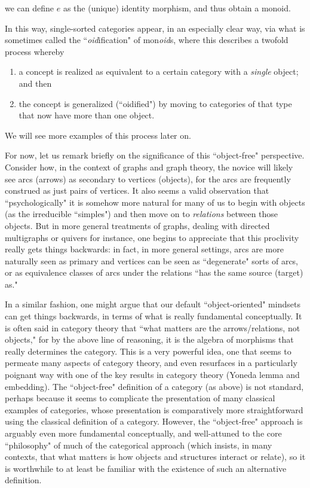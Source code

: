 \documentclass[a4paper]{book}
\theoremstyle{definition}
\theoremstyle{definition}
\theoremstyle{definition}
\theoremstyle{theorem}
\theoremstyle{definition}
\begin{document}
we can define $e$ as the (unique) identity morphism, and thus obtain a monoid. \par 
In this way, single-sorted categories appear, in an especially clear way, via what is sometimes called the ``\textit{oid}ification"  of mon\textit{oid}s, where this describes a twofold process whereby 
\begin{enumerate}
	\item a concept is realized as equivalent to a certain category with a \textit{single} object; and then 
	\item the concept is generalized (``oidified") by moving to categories of that type that now have more than one object.  
\end{enumerate} 
We will see more examples of this process later on. \par 
For now, let us remark briefly on the significance of this ``object-free" perspective. Consider how, in the context of graphs and graph theory, the novice will likely see arcs (arrows) as secondary to vertices (objects), for the arcs are frequently construed as just pairs of vertices. It also seems a valid observation that ``psychologically" it is somehow more natural for many of us to begin with objects (as the irreducible ``simples") and then move on to \textit{relations} between those objects. But in more general treatments of graphs, dealing with directed multigraphs or quivers for instance, one begins to appreciate that this proclivity really gets things backwards: in fact, in more general settings, arcs are more naturally seen as primary and vertices can be seen as ``degenerate" sorts of arcs, or as equivalence classes of arcs under the relations ``has the same source (target) as." \par 
In a similar fashion, one might argue that our default ``object-oriented" mindsets can get things backwards, in terms of what is really fundamental conceptually. It is often said in category theory that ``what matters are the arrows/relations, not objects," for by the above line of reasoning, it is the algebra of morphisms that really determines the category. This is a very powerful idea, one that seems to permeate many aspects of category theory, and even resurfaces in a particularly poignant way with one of the key results in category theory (Yoneda lemma and embedding). The ``object-free" definition of a category (as above) is not standard, perhaps because it seems to complicate the presentation of many classical examples of categories, whose presentation is comparatively more straightforward using the classical definition of a category. However, the ``object-free" approach is arguably even more fundamental conceptually, and well-attuned to the core ``philosophy" of much of the categorical approach (which insists, in many contexts, that what matters is how objects and structures interact or relate), so it is worthwhile to at least be familiar with the existence of such an alternative definition. 
\end{document}
